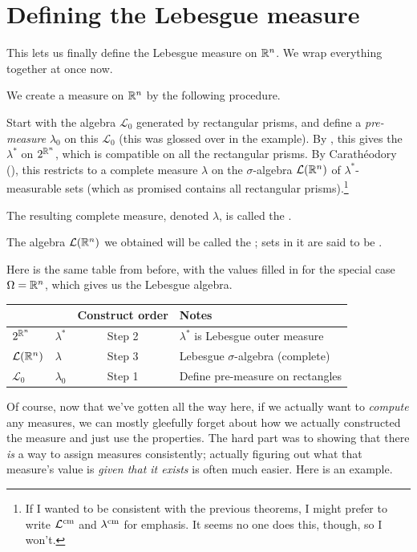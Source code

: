 \section{Defining the Lebesgue measure}
This lets us finally define the Lebesgue measure on $\mathbb R^n$.
We wrap everything together at once now.
\begin{definition}
	We create a measure on $\mathbb R^n$ by the following procedure.
	\begin{itemize}
		\ii Start with the algebra $\mathcal{L}_0$
		generated by rectangular prisms,
		and define a \emph{pre-measure} $\lambda_0$ on this $\mathcal{L}_0$
		(this was glossed over in the example).
		\ii By ,
		this gives the 
		$\lambda^\ast$ on $2^{\mathbb R^n}$,
		which is compatible on all the rectangular prisms.
		\ii By Carath\'{e}odory (),
		this restricts to a complete measure $\lambda$
		on the $\sigma$-algebra $\mathcal{L}(\mathbb R^n)$
		of $\lambda^\ast$-measurable sets
		(which as promised contains all rectangular prisms).\footnote{If
			I wanted to be consistent with the previous theorems,
			I might prefer to write $\mathcal{L}^\text{cm}$
			and $\lambda^\text{cm}$ for emphasis.
			It seems no one does this, though, so I won't.}
	\end{itemize}
	The resulting complete measure, denoted $\lambda$,
	is called the .

	The algebra $\mathcal{L}(\mathbb R^n)$ we obtained will be called the
	;
	sets in it are said to be .
\end{definition}

Here is the same table from before,
with the values filled in for the special case $\Omega = \mathbb R^n$,
which gives us the Lebesgue algebra.
\begin{center}
	\begin{tabular}[h]{llcl}
		& & Construct order & Notes \\ \hline
		$2^{\mathbb R^n}$ & $\lambda^\ast$ & Step 2 &
			$\lambda^\ast$ is Lebesgue outer measure \\[1em]
		$\mathcal L(\mathbb R^n)$ & $\lambda$ & Step 3 & Lebesgue $\sigma$-algebra (complete) \\[1em]
		$\mathcal L_0$ & $\lambda_0$ & Step 1 & Define pre-measure on rectangles
	\end{tabular}
\end{center}


Of course, now that we've gotten all the way here,
if we actually want to \emph{compute} any measures,
we can mostly gleefully forget about how we actually constructed
the measure and just use the properties.
The hard part was to showing that there \emph{is}
a way to assign measures consistently;
actually figuring out what that measure's value is
\emph{given that it exists} is often much easier.
Here is an example.

